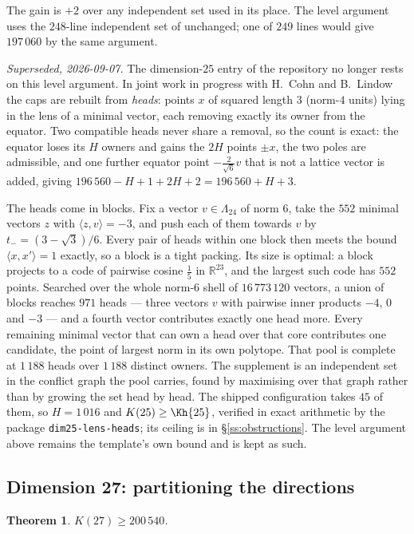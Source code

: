 \documentclass[11pt]{amsart}
\newtheorem{theorem}{Theorem}[section]
\theoremstyle{remark}
\newcommand{\Leech}{\Lambda_{24}}
\newcommand{\ip}[2]{\langle #1,#2\rangle}
\newcommand{\R}{\mathbb{R}}
\begin{document}
The gain is $+2$ over any independent set used in its place. The level argument
uses the $248$-line independent set of \cite{ma-etal2025} unchanged; one of
$249$ lines would give $197\,060$ by the same argument.

\emph{Superseded, 2026-09-07.} The dimension-$25$ entry of the repository
no longer rests on this level argument. In joint work in progress with H.~Cohn
and B.~Lindow the caps are rebuilt from \emph{heads}: points $x$ of squared
length $3$ (norm-$4$ units) lying in the lens of a minimal vector, each removing
exactly its owner from the equator. Two compatible heads never share a removal,
so the count is exact: the equator loses its $H$ owners and gains the $2H$ points
$\pm x$, the two poles are admissible, and one further equator point
$-\tfrac{2}{\sqrt6}v$ that is not a lattice vector is added, giving
$196\,560-H+1+2H+2=196\,560+H+3$.

The heads come in blocks. Fix a vector $v\in\Leech$ of norm $6$, take the $552$
minimal vectors $z$ with $\ip{z}{v}=-3$, and push each of them towards $v$ by
$t_-=(3-\sqrt3)/6$. Every pair of heads within one block then meets the bound
$\ip{x}{x'}=1$ exactly, so a block is a tight packing. Its size is optimal: a
block projects to a code of pairwise cosine $\tfrac15$ in $\R^{23}$, and the
largest such code has $552$ points. Searched over the whole norm-$6$
shell of $16\,773\,120$ vectors, a union of blocks reaches $971$ heads --- three
vectors $v$ with pairwise inner products $-4$, $0$ and $-3$ --- and a fourth
vector contributes exactly one head more. Every remaining minimal vector that
can own a head over that core contributes one candidate, the point of largest
norm in its own polytope. That pool is complete at $1\,188$ heads over
$1\,188$ distinct owners. The supplement is an independent set in the conflict
graph the pool carries, found by maximising over that graph rather than by
growing the set head by head. The shipped configuration takes $45$ of them, so
$H=1\,016$ and
$K(25)\ge\Kh{25}$, verified in exact arithmetic by the package
\texttt{dim25-lens-heads}; its ceiling is in \S\ref{ss:obstructions}. The level
argument above remains the template's own bound and is kept as such.

\subsection{Dimension 27: partitioning the directions}\label{ss:d27}

\begin{theorem}\label{thm:27}
$K(27)\ge200\,540$.
\end{theorem}
\end{document}
